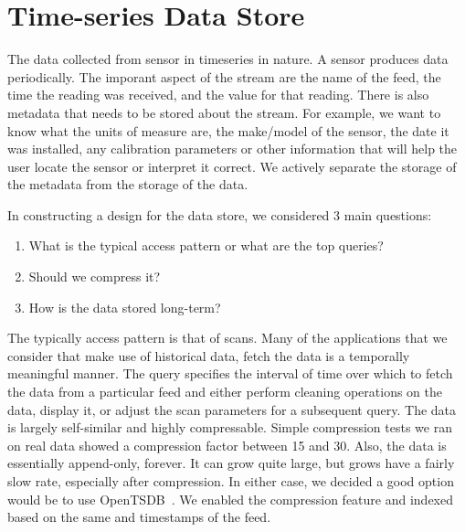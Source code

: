 \section{Time-series Data Store}


The data collected from sensor in timeseries in nature.  A sensor produces data periodically.  The imporant aspect of
the stream are the name of the feed, the time the reading was received, and the value for that reading.  There is also
metadata that needs to be stored about the stream.  For example, we want to know what the units of measure are, 
the make/model of the sensor, the date it was installed, any calibration parameters or other information that will help 
the user locate the sensor or interpret it correct.  We actively separate the storage of the metadata from the storage 
of the data.

In constructing a design for the data store, we considered 3 main questions:

\begin{enumerate}
\item What is the typical access pattern or what are the top queries?
\item Should we compress it?
\item How is the data stored long-term?
\end{enumerate}

The typically access pattern is that of scans.  Many of the applications that we consider that make use of historical data, fetch the data
is a temporally meaningful manner.  The query specifies the interval of time over which to fetch the data from a particular feed
and either perform cleaning operations on the data, display it, or adjust the scan parameters for a subsequent query.
The data is largely self-similar and highly compressable.  Simple compression tests we ran on real data showed a compression factor 
between 15 and 30.  Also, the data is essentially append-only, forever.  It can grow quite large, but grows have a fairly 
slow rate, especially after compression.  In either case, we decided a good option would be to use OpenTSDB~\cite{opentsdb}.
We enabled the compression feature and indexed based on the same and timestamps of the feed.

